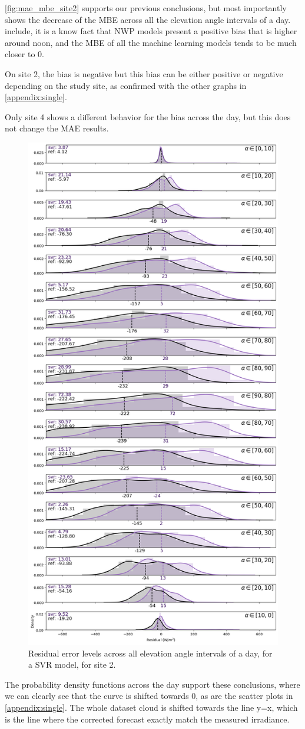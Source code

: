     \autoref{fig:mae_mbe_site2} supports our previous conclusions, but most importantly shows the decrease of the MBE across all the elevation angle intervals of a day.
include, it is a know fact that NWP models present a positive bias that is higher around noon, and the MBE of all the machine learning models tends to be much closer to 0.

On site 2, the bias is negative but this bias can be either positive or negative depending on the study site, as confirmed with the other graphs in \autoref{appendix:single}.

Only site 4 shows a different behavior for the bias across the day, but this does not change the MAE results. 
\begin{figure}[htb!]
    \centering
    \includegraphics[width=0.47\columnwidth]{figures/first_study/residual_errors_svr_site2_mae.png}
\caption{Residual error levels across all elevation angle intervals of a day, for a SVR model, for site 2.}
\end{figure}

The probability density functions across the day support these conclusions, where we can clearly see that the curve is shifted towards 0, as are the scatter plots in \autoref{appendix:single}.
The whole dataset cloud is shifted towards the line y=x, which is the line where the corrected forecast exactly match the measured irradiance.\\

